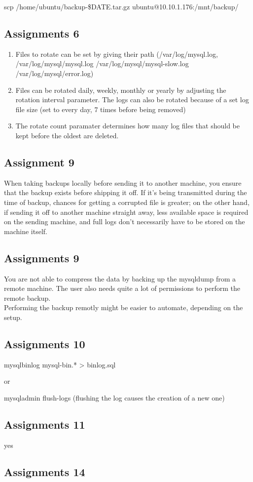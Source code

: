 scp /home/ubuntu/backup-\$DATE.tar.gz ubuntu@10.10.1.176:/mnt/backup/

\subsection{Assignments 6} 
\begin{enumerate}
\item Files to rotate can be set by giving their path (/var/log/mysql.log, /var/log/mysql/mysql.log /var/log/mysql/mysql-slow.log /var/log/mysql/error.log)
\item Files can be rotated daily, weekly, monthly or yearly by adjusting the rotation interval parameter. The logs can also be rotated because of a set log file size (set to every day, 7 times before being removed)
\item The rotate count paramater determines how many log files that should be kept before the oldest are deleted.
\end{enumerate}
	

\subsection{Assignment 9} 
When taking backups locally before sending it to another machine, you ensure that the backup exists before shipping it off. If it's being transmitted during the time of backup, chances for getting a corrupted file is greater; on the other hand, if sending it off to another machine straight away, less available space is required on the sending machine, and full logs don't necessarily have to be stored on the machine itself. 


\subsection{Assignments 9} 
You are not able to compress the data by backing up the mysqldump from a remote machine. The user also needs quite a lot of permissions to perform the remote backup.\\
Performing the backup remotly might be easier to automate, depending on the setup.

\subsection{Assignments 10} 
mysqlbinlog mysql-bin.* > binlog.sql

or 

mysqladmin flush-logs (flushing the log causes the creation of a new one)

\subsection{Assignments 11} 
yes

\subsection{Assignments 14} 
